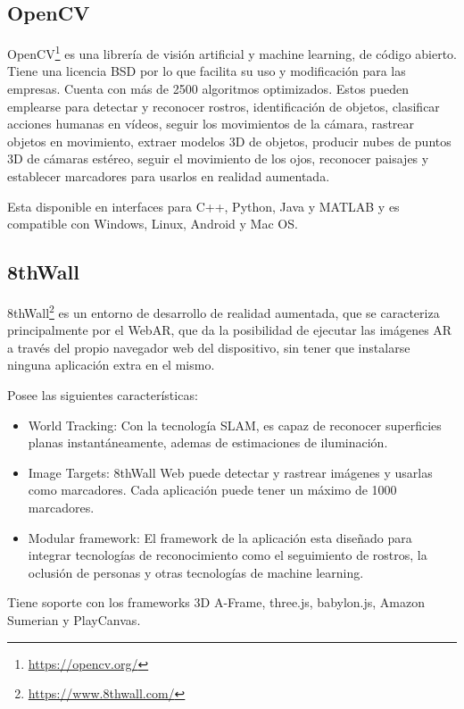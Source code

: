 \subsection{OpenCV}

OpenCV\footnote{\url{https://opencv.org/}} es una librería de visión artificial y machine learning, de código abierto. Tiene una licencia BSD por lo que facilita su uso y modificación para las empresas. Cuenta con más de 2500 algoritmos optimizados. Estos pueden emplearse para detectar y reconocer rostros, identificación de objetos, clasificar acciones humanas en vídeos, seguir los movimientos de la cámara, rastrear objetos en movimiento, extraer modelos 3D de objetos, producir nubes de puntos 3D de cámaras estéreo, seguir el movimiento de los ojos, reconocer paisajes y establecer marcadores para usarlos en realidad aumentada.

Esta disponible en interfaces para C++, Python, Java y MATLAB y es compatible con Windows, Linux, Android y Mac OS.


\subsection{8thWall}

8thWall\footnote{\url{https://www.8thwall.com/}}
es un entorno de desarrollo de realidad aumentada, que se caracteriza principalmente por el WebAR, que da la posibilidad de ejecutar las imágenes AR a través del propio navegador web del dispositivo, sin tener que instalarse ninguna aplicación extra en el mismo\cite{8thwall_products}.

Posee las siguientes características:

\begin{itemize}
	\item World Tracking: Con la tecnología SLAM, es capaz de reconocer superficies planas instantáneamente, ademas de estimaciones de iluminación.
	\item Image Targets: 8thWall Web puede detectar y rastrear imágenes y usarlas como marcadores. Cada aplicación puede tener un máximo de 1000 marcadores.
	\item Modular framework: El framework de la aplicación esta diseñado para integrar tecnologías de reconocimiento como el seguimiento de rostros, la oclusión de personas y otras tecnologías de machine learning.
\end{itemize}


Tiene soporte con los frameworks 3D A-Frame, three.js, babylon.js, Amazon Sumerian y PlayCanvas.

